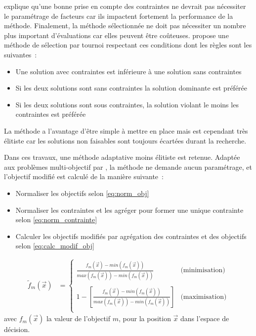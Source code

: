 \textcite{Coello2002} explique qu’une bonne prise en compte des contraintes ne devrait
pas nécessiter le paramétrage de facteurs car ils impactent
fortement la performance de la méthode. Finalement, la méthode sélectionnée ne
doit pas nécessiter un nombre plus important d’évaluations car elles peuvent être coûteuses.
\textcite{Deb2000311} propose une méthode de sélection par tournoi respectant ces conditions
dont les règles sont les suivantes~:
\begin{itemize}
  \item Une solution avec contraintes est inférieure à une solution sans contraintes
  \item Si les deux solutions sont sans contraintes la solution dominante est préférée
  \item Si les deux solutions sont sous contraintes, la solution violant le moins les contraintes est préférée
\end{itemize}
La méthode a l’avantage d’être simple à mettre en place mais est cependant
très élitiste car les solutions non faisables sont toujours écartées durant la
recherche.

Dans ces travaux, une méthode adaptative moins élitiste est retenue. Adaptée
aux problèmes multi-objectif par \textcite{Woldesenbet20073077}, la méthode ne demande
aucun paramétrage, et l’objectif modifié est calculé de la manière suivante~:
\begin{itemize}
  \item Normaliser les objectifs selon \eqref{eq:norm_obj}
  \item Normaliser les contraintes et les agréger pour former une unique contrainte selon \eqref{eq:norm_contrainte}
  \item Calculer les objectifs modifiés par agrégation des contraintes et des objectifs selon \eqref{eq:calc_modif_obj}
\end{itemize}

\begin{align}\label{eq:norm_obj}
  \tilde{f}_{m}(\vec{x}) &= \begin{cases}
    \frac{f_{m}(\vec{x}) - min(f_{m}(\vec{x}))}{max(f_{m}(\vec{x})) - min(f_{m}(\vec{x}))}
    & \text{(minimisation)} \\ \\ 1 - \left[\frac{f_{m}(\vec{x}) -
    min(f_{m}(\vec{x}))}{max(f_{m}(\vec{x})) - min(f_{m}(\vec{x}))}\right] &
    \text{(maximisation)} \\
  \end{cases}
\end{align}
avec $f_{m}(\vec{x})$ la valeur de l’objectif $m$, pour la position $\vec{x}$ dans l’espace de décision.

